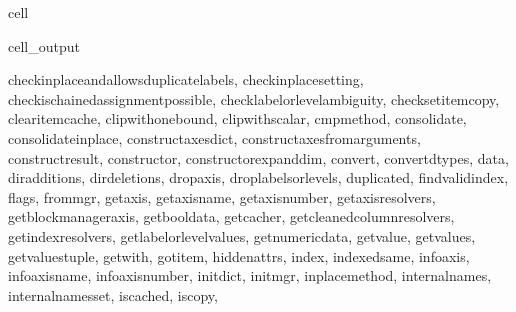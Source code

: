 \documentclass[letterpaper,10pt,english]{jupyterBook}
\begin{document}
\begin{sphinxuseclass}{cell}
\begin{sphinxVerbatimOutput}
\begin{sphinxuseclass}{cell_output}
\begin{sphinxVerbatim}[commandchars=\\\{\}]
\PYGZsq{}\PYGZus{}check\PYGZus{}inplace\PYGZus{}and\PYGZus{}allows\PYGZus{}duplicate\PYGZus{}labels\PYGZsq{}, \PYGZsq{}\PYGZus{}check\PYGZus{}inplace\PYGZus{}setting\PYGZsq{}, \PYGZsq{}\PYGZus{}check\PYGZus{}is\PYGZus{}chained\PYGZus{}assignment\PYGZus{}possible\PYGZsq{}, \PYGZsq{}\PYGZus{}check\PYGZus{}label\PYGZus{}or\PYGZus{}level\PYGZus{}ambiguity\PYGZsq{}, \PYGZsq{}\PYGZus{}check\PYGZus{}setitem\PYGZus{}copy\PYGZsq{}, \PYGZsq{}\PYGZus{}clear\PYGZus{}item\PYGZus{}cache\PYGZsq{}, \PYGZsq{}\PYGZus{}clip\PYGZus{}with\PYGZus{}one\PYGZus{}bound\PYGZsq{}, \PYGZsq{}\PYGZus{}clip\PYGZus{}with\PYGZus{}scalar\PYGZsq{}, \PYGZsq{}\PYGZus{}cmp\PYGZus{}method\PYGZsq{}, \PYGZsq{}\PYGZus{}consolidate\PYGZsq{}, \PYGZsq{}\PYGZus{}consolidate\PYGZus{}inplace\PYGZsq{}, \PYGZsq{}\PYGZus{}construct\PYGZus{}axes\PYGZus{}dict\PYGZsq{}, \PYGZsq{}\PYGZus{}construct\PYGZus{}axes\PYGZus{}from\PYGZus{}arguments\PYGZsq{}, \PYGZsq{}\PYGZus{}construct\PYGZus{}result\PYGZsq{}, \PYGZsq{}\PYGZus{}constructor\PYGZsq{}, \PYGZsq{}\PYGZus{}constructor\PYGZus{}expanddim\PYGZsq{}, \PYGZsq{}\PYGZus{}convert\PYGZsq{}, \PYGZsq{}\PYGZus{}convert\PYGZus{}dtypes\PYGZsq{}, \PYGZsq{}\PYGZus{}data\PYGZsq{}, \PYGZsq{}\PYGZus{}dir\PYGZus{}additions\PYGZsq{}, \PYGZsq{}\PYGZus{}dir\PYGZus{}deletions\PYGZsq{}, \PYGZsq{}\PYGZus{}drop\PYGZus{}axis\PYGZsq{}, \PYGZsq{}\PYGZus{}drop\PYGZus{}labels\PYGZus{}or\PYGZus{}levels\PYGZsq{}, \PYGZsq{}\PYGZus{}duplicated\PYGZsq{}, \PYGZsq{}\PYGZus{}find\PYGZus{}valid\PYGZus{}index\PYGZsq{}, \PYGZsq{}\PYGZus{}flags\PYGZsq{}, \PYGZsq{}\PYGZus{}from\PYGZus{}mgr\PYGZsq{}, \PYGZsq{}\PYGZus{}get\PYGZus{}axis\PYGZsq{}, \PYGZsq{}\PYGZus{}get\PYGZus{}axis\PYGZus{}name\PYGZsq{}, \PYGZsq{}\PYGZus{}get\PYGZus{}axis\PYGZus{}number\PYGZsq{}, \PYGZsq{}\PYGZus{}get\PYGZus{}axis\PYGZus{}resolvers\PYGZsq{}, \PYGZsq{}\PYGZus{}get\PYGZus{}block\PYGZus{}manager\PYGZus{}axis\PYGZsq{}, \PYGZsq{}\PYGZus{}get\PYGZus{}bool\PYGZus{}data\PYGZsq{}, \PYGZsq{}\PYGZus{}get\PYGZus{}cacher\PYGZsq{}, \PYGZsq{}\PYGZus{}get\PYGZus{}cleaned\PYGZus{}column\PYGZus{}resolvers\PYGZsq{}, \PYGZsq{}\PYGZus{}get\PYGZus{}index\PYGZus{}resolvers\PYGZsq{}, \PYGZsq{}\PYGZus{}get\PYGZus{}label\PYGZus{}or\PYGZus{}level\PYGZus{}values\PYGZsq{}, \PYGZsq{}\PYGZus{}get\PYGZus{}numeric\PYGZus{}data\PYGZsq{}, \PYGZsq{}\PYGZus{}get\PYGZus{}value\PYGZsq{}, \PYGZsq{}\PYGZus{}get\PYGZus{}values\PYGZsq{}, \PYGZsq{}\PYGZus{}get\PYGZus{}values\PYGZus{}tuple\PYGZsq{}, \PYGZsq{}\PYGZus{}get\PYGZus{}with\PYGZsq{}, \PYGZsq{}\PYGZus{}gotitem\PYGZsq{}, \PYGZsq{}\PYGZus{}hidden\PYGZus{}attrs\PYGZsq{}, \PYGZsq{}\PYGZus{}index\PYGZsq{}, \PYGZsq{}\PYGZus{}indexed\PYGZus{}same\PYGZsq{}, \PYGZsq{}\PYGZus{}info\PYGZus{}axis\PYGZsq{}, \PYGZsq{}\PYGZus{}info\PYGZus{}axis\PYGZus{}name\PYGZsq{}, \PYGZsq{}\PYGZus{}info\PYGZus{}axis\PYGZus{}number\PYGZsq{}, \PYGZsq{}\PYGZus{}init\PYGZus{}dict\PYGZsq{}, \PYGZsq{}\PYGZus{}init\PYGZus{}mgr\PYGZsq{}, \PYGZsq{}\PYGZus{}inplace\PYGZus{}method\PYGZsq{}, \PYGZsq{}\PYGZus{}internal\PYGZus{}names\PYGZsq{}, \PYGZsq{}\PYGZus{}internal\PYGZus{}names\PYGZus{}set\PYGZsq{}, \PYGZsq{}\PYGZus{}is\PYGZus{}cached\PYGZsq{}, \PYGZsq{}\PYGZus{}is\PYGZus{}copy\PYGZsq{}, 
\end{sphinxVerbatim}
\end{sphinxuseclass}
\end{sphinxVerbatimOutput}
\end{sphinxuseclass}
\end{document}
